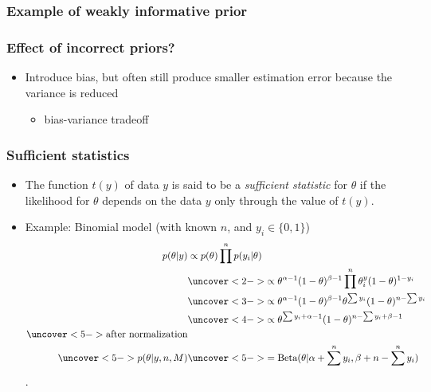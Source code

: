\documentclass[10pt]{beamer}
\begin{document}
\begin{frame}
\frametitle{Example of weakly informative prior}

  \begin{center}
\end{center}
\end{frame}

\begin{frame}
\frametitle{Effect of incorrect priors?}

\begin{itemize}
  \item Introduce bias, but often still produce smaller estimation
    error because the variance is reduced
  \begin{itemize}
    \item bias-variance tradeoff
  \end{itemize}
\end{itemize}
\end{frame}

\begin{frame}
  \frametitle{Sufficient statistics}

\begin{itemize}
  \item The function $t(y)$ of data $y$ is said to be a {\em sufficient statistic} for $\theta$ if the likelihood for $\theta$ depends on the
data $y$ only through the value of $t(y)$.
  \item Example: Binomial model (with known $n$, and $y_i \in \{0,1\}$)
  \begin{align*}
      p(\theta|y) & \propto p(\theta) \prod^n p(y_i | \theta) \\
      &\uncover<2->{ \propto \theta^{\alpha-1} (1-\theta)^{\beta-1} \prod^n\theta^y_i (1-\theta)^{1-y_i}} \\
      &\uncover<3->{ \propto \theta^{\alpha-1} (1-\theta)^{\beta-1} \theta^{\sum y_i} (1-\theta)^{n - \sum y_i}} \\
      &\uncover<4->{ \propto
        \theta^{\sum y_i+\alpha-1} (1-\theta)^{n-\sum y_i+\beta-1}}\\
      \uncover<5->{\text{after normalization}} &\\
      \uncover<5->{p(\theta|y,n,M)}
      &\uncover<5->{ = \text{Beta}(\theta|\alpha+\sum^n y_i,\beta+n-\sum^n y_i)}
  \end{align*}
  .
\end{itemize}

\end{frame}
\end{document}
